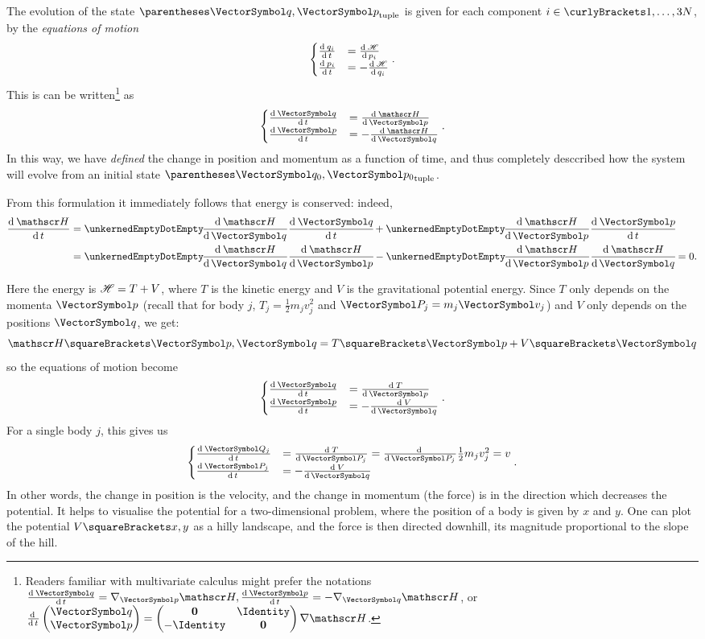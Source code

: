 \documentclass[10pt, a4paper, twoside]{basestyle}
\begin{document}
The evolution of the state $\tuple{\vq, \vp}$ is given for each component $i\in
\set{1,\dotsc,3N}$, by the \emph{equations of motion}
\[
\begin{cases}
\deriv t {q_i} &= \deriv {p_i} \Hamiltonian \\
\deriv t {p_i} &= -\deriv {q_i} \Hamiltonian
\end{cases}.
\]
This is can be written\footnote{Readers familiar with multivariate calculus
might prefer the notations $\deriv t {\vq} = \grad_{\vp} \Hamiltonian,
\deriv t {\vp} = -\grad_{\vq} \Hamiltonian$, or $\derivop t 
\begin{pmatrix}
\vq \\
\vp
\end{pmatrix} =
\begin{pmatrix}
\nullmat    & \Identity \\
-\Identity & \nullmat
\end{pmatrix}
\grad \Hamiltonian$.}
as
\[
\begin{cases}
\deriv t {\vq} &= \deriv {\vp} \Hamiltonian \\
\deriv t {\vp} &= -\deriv {\vq} \Hamiltonian
\end{cases}.
\]
In this way, we have \emph{defined} the change in position and momentum as a
function of time, and thus completely desccribed how the system will evolve from
an initial state $\tuple{\vq_0, \vp_0}$.

From this formulation it immediately follows that energy is conserved:
indeed,
\begin{align*}
\deriv t \Hamiltonian &= \scal{\deriv \vq \Hamiltonian}{\deriv t \vq}
    + \scal{\deriv \vp \Hamiltonian}{\deriv t \vp} \\
&= \scal{\deriv \vq \Hamiltonian}{\deriv \vp \Hamiltonian}
    - \scal{\deriv \vp \Hamiltonian}{\deriv \vq \Hamiltonian} = 0.
\end{align*}

Here the energy is $\Hamiltonian = T + V$, where $T$ is the kinetic energy
and $V$ is the gravitational potential energy.
Since $T$ only depends on the momenta $\vp$ (recall that for body $j$,
$T_j = \frac{1}{2} m_j v_j^2$ and $\vP_j = m_j\vv_j$) and $V$ only depends
on the positions $\vq$, we get:
\[
\Hamiltonian\of{\vp, \vq} = T\of{\vp} + V\of{\vq}
\]
so the equations of motion become
\[
\begin{cases}
\deriv t {\vq} &= \deriv {\vp} T \\
\deriv t {\vp} &= -\deriv {\vq} V
\end{cases}.
\]
For a single body $j$, this gives us
\[
\begin{cases}
\deriv t {\vQ_j} &= \deriv {\vP_j} T = \derivop {\vP_j}\frac{1}{2} m_j v_j^2
    = v \\
\deriv t {\vP_j} &= -\deriv {\vq} V
\end{cases}.
\]
In other words, the change in position is the velocity, and the change in
momentum (the force) is in the direction which decreases the potential.
It helps to visualise the potential for a two-dimensional problem, where the
position of a body is given by $x$ and $y$. One can plot the potential
$V\of{x, y}$ as a hilly landscape, and the force is then directed downhill,
its magnitude proportional to the slope of the hill.
\end{document}
